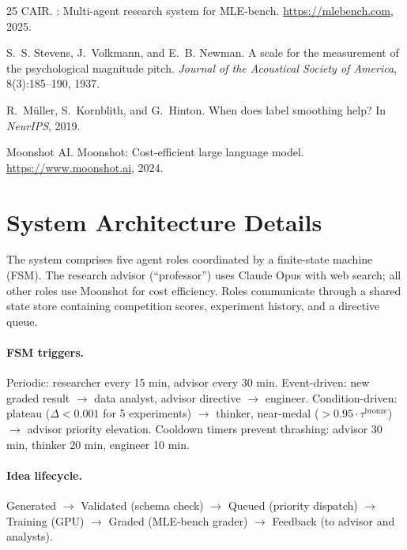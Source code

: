 \documentclass{article}
\begin{document}
\begin{thebibliography}{25}
{CAIR}.
: Multi-agent research system for {MLE}-bench.
\newblock \url{https://mlebench.com}, 2025.

S.~S. Stevens, J.~Volkmann, and E.~B. Newman.
\newblock A scale for the measurement of the psychological magnitude pitch.
\newblock \emph{Journal of the Acoustical Society of America}, 8(3):185--190, 1937.

R.~M\"{u}ller, S.~Kornblith, and G.~Hinton.
\newblock When does label smoothing help?
\newblock In \emph{NeurIPS}, 2019.

{Moonshot AI}.
\newblock Moonshot: Cost-efficient large language model.
\newblock \url{https://www.moonshot.ai}, 2024.

\end{thebibliography}

\newpage
\appendix

\section{System Architecture Details}
\label{app:architecture}

The system comprises five agent roles coordinated by a finite-state machine (FSM). The research advisor (``professor'') uses Claude Opus with web search; all other roles use Moonshot for cost efficiency. Roles communicate through a shared state store containing competition scores, experiment history, and a directive queue.

\paragraph{FSM triggers.} Periodic: researcher every 15 min, advisor every 30 min. Event-driven: new graded result $\rightarrow$ data analyst, advisor directive $\rightarrow$ engineer. Condition-driven: plateau ($\Delta < 0.001$ for 5 experiments) $\rightarrow$ thinker, near-medal ($> 0.95 \cdot \tau^{\text{bronze}}$) $\rightarrow$ advisor priority elevation. Cooldown timers prevent thrashing: advisor 30 min, thinker 20 min, engineer 10 min.

\paragraph{Idea lifecycle.} Generated $\rightarrow$ Validated (schema check) $\rightarrow$ Queued (priority dispatch) $\rightarrow$ Training (GPU) $\rightarrow$ Graded (MLE-bench grader) $\rightarrow$ Feedback (to advisor and analysts).
\end{document}
